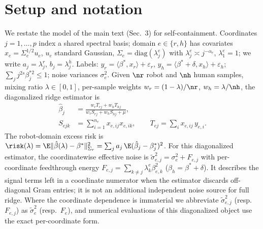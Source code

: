 \section{Setup and notation}
\label{supp:setup}

We restate the model of the main text (Sec.~3) for self-containment.
Coordinates $j = 1,\dots,p$ index a shared spectral basis; domain $e \in \{r, h\}$ has covariates $x_e = \Sigma_e^{1/2} u_e$, $u_e$ standard Gaussian, $\Sigma_e = \mathrm{diag}(\lambda^e_j)$ with $\lambda^e_j \asymp j^{-\alpha_e}$, $\lambda^e_1 = 1$; we write $a_j = \lambda^r_j$, $b_j = \lambda^h_j$.
Labels: $y_r = \langle\beta^*, x_r\rangle + \varepsilon_r$, $y_h = \langle\beta^* + \delta, x_h\rangle + \varepsilon_h$; $\sum_j j^{2s}\beta_j^{*2} \le 1$; noise variances $\sigma_e^2$.
Given $\nr$ robot and $\nh$ human samples, mixing ratio $\lambda \in [0,1]$, per-sample weights $w_r = (1-\lambda)/\nr$, $w_h = \lambda/\nh$, the diagonalized ridge estimator is
\begin{equation}
\begin{aligned}
  \hat\beta_j &= \frac{w_r T_{rj} + w_h T_{hj}}{w_r S_{rj} + w_h S_{hj} + \mu},\\
  S_{ejk} &= {\textstyle\sum_{i=1}^{n_e}} x_{e,ij} x_{e,ik},\qquad
  T_{ej} = {\textstyle\sum_i} x_{e,ij}\, y_{e,i}.
\end{aligned}
  \label{supp:eq:estimator}
\end{equation}
The robot-domain excess risk is $\risk(\lambda) = \E\|\hat\beta(\lambda) - \beta^*\|^2_{\Sigma_r} = \sum_j a_j\, \E(\hat\beta_j - \beta^*_j)^2$.
For this diagonalized estimator, the coordinatewise effective noise is $\tilde\sigma_{e,j}^2 = \sigma_e^2 + F_{e,j}$ with per-coordinate feedthrough energy $F_{e,j} = \sum_{k\neq j} \lambda^e_k \beta_{e,k}^2$ ($\beta_h = \beta^* + \delta$). It describes the signal terms left in a coordinate numerator when the estimator discards off-diagonal Gram entries; it is not an additional independent noise source for full ridge. Where the coordinate dependence is immaterial we abbreviate $\tilde\sigma_{e,j}^2$ (resp.\ $F_{e,j}$) as $\tilde\sigma_e^2$ (resp.\ $F_e$), and numerical evaluations of this diagonalized object use the exact per-coordinate form.

